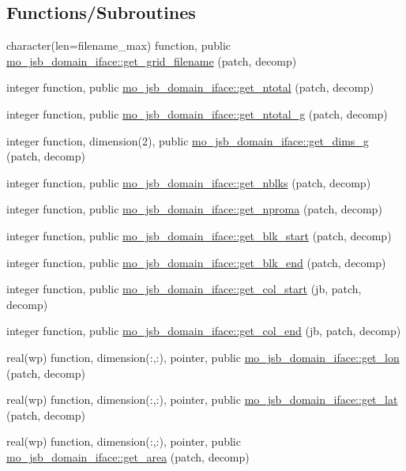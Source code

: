 \subsection*{Functions/\+Subroutines}
\begin{DoxyCompactItemize}
\item 
character(len=filename\+\_\+max) function, public \hyperlink{namespacemo__jsb__domain__iface_a6f4d6dce413ee86596fa8130c5411cbf}{mo\+\_\+jsb\+\_\+domain\+\_\+iface\+::get\+\_\+grid\+\_\+filename} (patch, decomp)
\item 
integer function, public \hyperlink{namespacemo__jsb__domain__iface_a937c2c8be9a4a923599e514ad683d7ed}{mo\+\_\+jsb\+\_\+domain\+\_\+iface\+::get\+\_\+ntotal} (patch, decomp)
\item 
integer function, public \hyperlink{namespacemo__jsb__domain__iface_a674e9ce6f4bbf62ff20c59179c0bf5e4}{mo\+\_\+jsb\+\_\+domain\+\_\+iface\+::get\+\_\+ntotal\+\_\+g} (patch, decomp)
\item 
integer function, dimension(2), public \hyperlink{namespacemo__jsb__domain__iface_a9420a80fdea7880fc20eab6624968038}{mo\+\_\+jsb\+\_\+domain\+\_\+iface\+::get\+\_\+dims\+\_\+g} (patch, decomp)
\item 
integer function, public \hyperlink{namespacemo__jsb__domain__iface_ad0a4a132184f38ef16cd49677f9ea341}{mo\+\_\+jsb\+\_\+domain\+\_\+iface\+::get\+\_\+nblks} (patch, decomp)
\item 
integer function, public \hyperlink{namespacemo__jsb__domain__iface_a7eb1c883deb8b5fb2250933524d1eb04}{mo\+\_\+jsb\+\_\+domain\+\_\+iface\+::get\+\_\+nproma} (patch, decomp)
\item 
integer function, public \hyperlink{namespacemo__jsb__domain__iface_ae4e23af6b9ee29e7b8d1a63923bd36a8}{mo\+\_\+jsb\+\_\+domain\+\_\+iface\+::get\+\_\+blk\+\_\+start} (patch, decomp)
\item 
integer function, public \hyperlink{namespacemo__jsb__domain__iface_afdc692d241094026338672555daf11a8}{mo\+\_\+jsb\+\_\+domain\+\_\+iface\+::get\+\_\+blk\+\_\+end} (patch, decomp)
\item 
integer function, public \hyperlink{namespacemo__jsb__domain__iface_a286a7d88ee91a2541b4285f22ad7c442}{mo\+\_\+jsb\+\_\+domain\+\_\+iface\+::get\+\_\+col\+\_\+start} (jb, patch, decomp)
\item 
integer function, public \hyperlink{namespacemo__jsb__domain__iface_abf860a70b92fa185920b6598b2e897cb}{mo\+\_\+jsb\+\_\+domain\+\_\+iface\+::get\+\_\+col\+\_\+end} (jb, patch, decomp)
\item 
real(wp) function, dimension(\+:,\+:), pointer, public \hyperlink{namespacemo__jsb__domain__iface_a026b4e63e8ae775bc1621cc37da5da2b}{mo\+\_\+jsb\+\_\+domain\+\_\+iface\+::get\+\_\+lon} (patch, decomp)
\item 
real(wp) function, dimension(\+:,\+:), pointer, public \hyperlink{namespacemo__jsb__domain__iface_a3d9e98bf333fe59aa4108a37ed0947d3}{mo\+\_\+jsb\+\_\+domain\+\_\+iface\+::get\+\_\+lat} (patch, decomp)
\item 
real(wp) function, dimension(\+:,\+:), pointer, public \hyperlink{namespacemo__jsb__domain__iface_af469456668d8bdb4619e492296338af7}{mo\+\_\+jsb\+\_\+domain\+\_\+iface\+::get\+\_\+area} (patch, decomp)
\end{DoxyCompactItemize}

